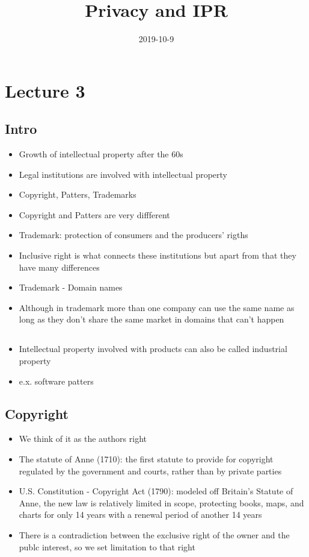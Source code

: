 \documentclass{article}
\title{Privacy and IPR}
\date{2019-10-9}
\begin{document}
   \maketitle
   \newpage

\section{Lecture 3}

\subsection{Intro}
\begin{itemize}
\item Growth of intellectual property after the 60s
\item Legal institutions are involved with intellectual property 
\item Copyright, Patters, Trademarks
\item Copyright and Patters are very diffferent 
\item Trademark: protection of consumers and the producers' rigths 
\item Inclusive right is what connects these institutions but apart from that they have many differences 
\item Trademark - Domain names 
\item Although in trademark more than one company can use the same name as long as they don't share the same market in domains that can't happen 
\end{itemize}

\subsection{}
\begin{itemize}
\item Intellectual property involved with products can also be called industrial property 
\item e.x. software patters 
\end{itemize}

\subsection{Copyright} 
\begin{itemize}
\item We think of it as the authors right 
\item The statute of Anne (1710): the first statute to provide for copyright regulated by the government and courts, rather than by private parties
\item U.S. Constitution - Copyright Act (1790): modeled off Britain's Statute of Anne, the new law is relatively limited in scope, protecting books, maps, and charts for only 14 years with a renewal period of another 14 years
\item There is a contradiction between the exclusive right of the owner and the publc interest, so we set limitation to that right 
\end{itemize}
\end{document}
